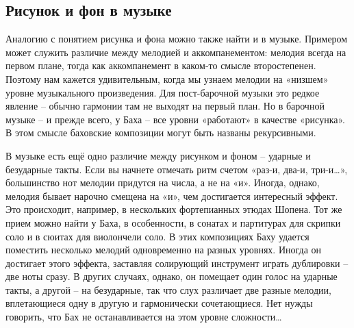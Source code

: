 \documentclass[../main.tex]{subfiles}
\begin{document}


\subsection{Рисунок и фон в музыке}

Аналогию с понятием рисунка и фона можно также найти и в музыке. Примером может служить различие между мелодией и аккомпанементом: мелодия всегда на первом плане, тогда как аккомпанемент в каком-то смысле второстепенен. Поэтому нам кажется удивительным, когда мы узнаем мелодии на «низшем» уровне музыкального произведения. Для пост-барочной музыки это редкое явление \--- обычно гармонии там не выходят на первый план. Но в барочной музыке \--- и прежде всего, у Баха \--- все уровни «работают» в качестве «рисунка». В этом смысле баховские композиции могут быть названы рекурсивными.

В музыке есть ещё одно различие между рисунком и фоном \--- ударные и безударные такты. Если вы начнете отмечать ритм счетом «раз-и, два-и, три-и\ldots», большинство нот мелодии придутся на числа, а не на «и». Иногда, однако, мелодия бывает нарочно смещена на «и», чем достигается интересный эффект. Это происходит, например, в нескольких фортепианных этюдах Шопена. Тот же прием можно найти у Баха, в особенности, в сонатах и партитурах для скрипки соло и в сюитах для виолончели соло. В этих композициях Баху удается поместить несколько мелодий одновременно на разных уровнях. Иногда он достигает этого эффекта, заставляя солирующий инструмент играть дублировки \--- две ноты сразу. В других случаях, однако, он помещает один голос на ударные такты, а другой \--- на безударные, так что слух различает две разные мелодии, вплетающиеся одну в другую и гармонически сочетающиеся. Нет нужды говорить, что Бах не останавливается на этом уровне сложности\ldots{}
\end{document}

